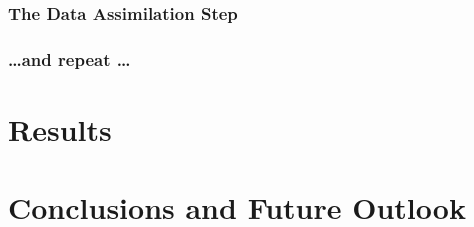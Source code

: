 \subsubsection{The Data Assimilation Step}
\label{methods:applicaiton:assimilation}

\subsubsection{\ldots and repeat \ldots}
\label{methods:application:repeat}

\section{Results}
\label{malleson:results}

\section{Conclusions and Future Outlook}
\label{malleson:conclusion}

